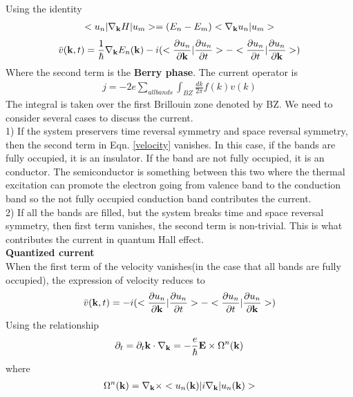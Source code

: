 \documentclass[a4paper]{article}
\begin{document}
Using the identity
\begin{align*}
	<u_n|\nabla_{\bf k} H | u_m> = (E_n - E_m) < \nabla_{\bf k} u_n| u_m>
\end{align*}
\begin{align}\label{velocity}
	\bar v({\bf k},t) = \frac{1}{\hbar} \nabla_{\bf k} E_n({\bf k}) 
	- i  (<\frac{\partial u_n}{\partial {\bf k}}| \frac{\partial u_n}{\partial t}> -<\frac{\partial u_n}{\partial t}| \frac{\partial u_n}{\partial {\bf k}}>)
\end{align}
Where the second term is the {\bf Berry phase}.
The current operator is
\begin{align*}
	j = -2e\sum_{all bands}\int_{BZ}\frac{dk}{2 \pi} f(k)v(k)
\end{align*}
The integral is taken over the first Brillouin zone denoted by BZ.
We need to consider several cases to discuss the current.\\
1) If the system preservers time reversal symmetry and space reversal symmetry, then the second term in Eqn. \ref{velocity} vanishes. In this case, if the bands are fully occupied, it is an insulator. If the band are not fully occupied, it is an conductor. The semiconductor is something between this two where the thermal excitation can promote the electron going from valence band to the conduction band so the not fully occupied conduction band contributes the current.\\
2) If all the bands are filled, but the system breaks time and space reversal symmetry, then first term vanishes, the second term is non-trivial. This is what contributes the current in quantum Hall effect.\\
{\bf Quantized current}\\
When the first term of the velocity vanishes(in the case that all bands are fully occupied), the expression of velocity reduces to
\begin{align}
	\bar v({\bf k},t) = - i  (<\frac{\partial u_n}{\partial {\bf k}}| \frac{\partial u_n}{\partial t}> -<\frac{\partial u_n}{\partial t}| \frac{\partial u_n}{\partial {\bf k}}>)
\end{align}
Using the relationship 
\begin{align*}
	\partial_t = \partial_t {\bf k} \cdot \nabla_{\bf k} = -\frac{e}{\hbar} {\bf E} \times \Omega^n({\bf k})
\end{align*}
where 
\begin{align*}
	\Omega^{n}({\bf k}) = \nabla_{\bf k} \times <u_n({\bf k})|i\nabla_{\bf k}|u_n({\bf k})>
\end{align*}
\end{document}
